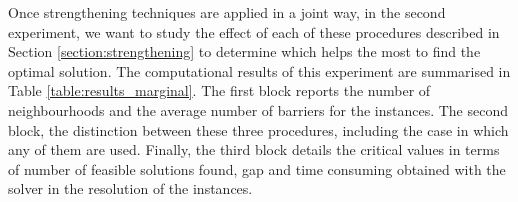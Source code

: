 \documentclass[a4paper,  review, authoryear, 1p.]{elsarticle}
\newcommand{\JP}[1]{{\color{armygreen}#1}}
\newcommand{\CV}[1]{{\color{red}#1}}
\begin{document}



\CV{
Once strengthening techniques are applied in a joint way, in the second experiment, we want to study the effect of each of these procedures described in Section \ref{section:strengthening} to determine which helps the most to find the optimal solution. The computational results of this experiment are summarised in Table \ref{table:results_marginal}. The first block reports the number of neighbourhoods and the average number of barriers for the instances. The second block, the distinction between these three procedures, including the case in which any of them are used. Finally, the third block details the critical values in terms of number of feasible solutions found, gap and time consuming obtained with the solver in the resolution of the instances.


}
\end{document}
